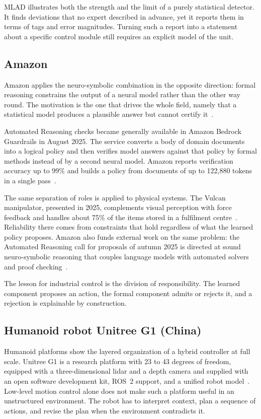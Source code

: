 MLAD illustrates both the strength and the limit of a purely statistical
detector. It finds deviations that no expert described in advance, yet it
reports them in terms of tags and error magnitudes. Turning such a report into a
statement about a specific control module still requires an explicit model of
the unit.

\subsection{Amazon}

Amazon applies the neuro-symbolic combination in the opposite direction: formal
reasoning constrains the output of a neural model rather than the other way
round. The motivation is the one that drives the whole field, namely that a
statistical model produces a plausible answer but cannot certify
it~\cite{Marcus2024, WSJ2024}.

Automated Reasoning checks became generally available in Amazon Bedrock
Guardrails in August 2025. The service converts a body of domain documents into
a logical policy and then verifies model answers against that policy by formal
methods instead of by a second neural model. Amazon reports verification
accuracy up to 99\% and builds a policy from documents of up to 122,880 tokens
in a single pass~\cite{AWS2025ar}.

The same separation of roles is applied to physical systems. The Vulcan
manipulator, presented in 2025, complements visual perception with force
feedback and handles about 75\% of the items stored in a fulfilment
centre~\cite{AmazonVulcan2025}. Reliability there comes from constraints that
hold regardless of what the learned policy proposes. Amazon also funds external
work on the same problem: the Automated Reasoning call for proposals of autumn
2025 is directed at sound neuro-symbolic reasoning that couples language models
with automated solvers and proof checking~\cite{AmazonAR2025}.

The lesson for industrial control is the division of responsibility. The learned
component proposes an action, the formal component admits or rejects it, and a
rejection is explainable by construction.

\subsection{Humanoid robot Unitree G1 (China)}

Humanoid platforms show the layered organization of a hybrid controller at full
scale. Unitree G1 is a research platform with 23 to 43 degrees of freedom,
equipped with a three-dimensional lidar and a depth camera and supplied with an
open software development kit, ROS~2 support, and a unified robot
model~\cite{UnitreeG1}. Low-level motion control alone does not make such a
platform useful in an unstructured environment. The robot has to interpret
context, plan a sequence of actions, and revise the plan when the environment
contradicts it.

